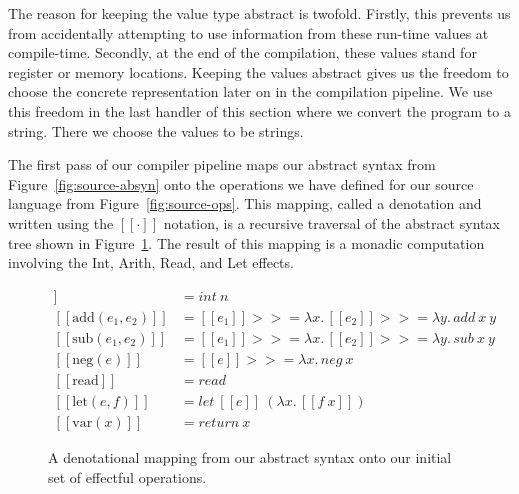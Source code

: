 \documentclass[a4paper,UKenglish,cleveref, autoref, thm-restate, anonymous]{oasics-v2021}
\newcommand\bind[1]{>\!\!>\!\!= \lambda #1.\,}
\begin{document}
    The reason for keeping the value type abstract is twofold. 
    Firstly, this prevents us from accidentally attempting to use information from these run-time values at compile-time. 
    Secondly, at the end of the compilation, these values stand for register or memory locations.
    Keeping the values abstract gives us the freedom to choose the concrete representation later on in the compilation pipeline.
    We use this freedom in the last handler of this section where we convert the program to a string.
    There we choose the values to be strings.

The first pass of our compiler pipeline maps our abstract syntax from Figure~\ref{fig:source-absyn} onto the operations we have defined for our source language from Figure~\ref{fig:source-ops}.
This mapping, called a denotation and written using the $[\![ \cdot ]\!]$ notation, is a recursive traversal of the abstract syntax tree shown in Figure~\ref{fig:den}.
The result of this mapping is a monadic computation involving the Int, Arith, Read, and Let effects.

\begin{figure}[ht]
\begin{align*}
  [\![ \mathrm{int}(n) ]\!] & = \mathit{int}~n \\
  [\![ \mathrm{add}(e_1, e_2) ]\!] & = [\![ e_1 ]\!] \bind{x} [\![ e_2 ]\!] \bind{y} \mathit{add}~x~y \\
  [\![ \mathrm{sub}(e_1, e_2) ]\!] & = [\![ e_1 ]\!] \bind{x} [\![ e_2 ]\!] \bind{y} \mathit{sub}~x~y \\
  [\![ \mathrm{neg}(e) ]\!] & = [\![ e ]\!] \bind{x} \mathit{neg}~x \\
  [\![ \mathrm{read} ]\!] & = \mathit{read} \\
  [\![ \mathrm{let}(e,f) ]\!] & = \mathit{let}~[\![e]\!]~(\lambda x.\, [\![ f~x ]\!]) \\
  [\![ \mathrm{var}(x) ]\!] & = \mathit{return}~x
\end{align*}
  \caption{A denotational mapping from our abstract syntax onto our initial set of effectful operations.}\label{fig:den}
\end{figure}
\end{document}
